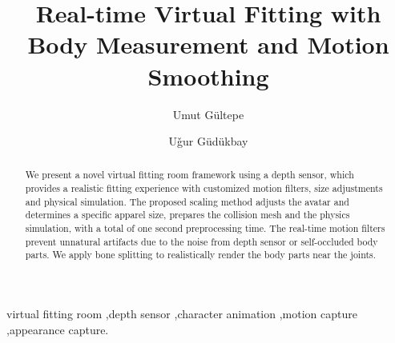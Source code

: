 \documentclass[number,preprint,review,12pt]{elsarticle}
\begin{document}
\begin{frontmatter}



\title{Real-time Virtual Fitting with \\Body Measurement and Motion Smoothing}


\author{Umut G\"{u}ltepe}
\author{U\v{g}ur G\"{u}d\"{u}kbay}

\address{Bilkent University, Department of Computer Engineering, Bilkent 06800 Ankara Turkey}

\begin{abstract}
We present a novel virtual fitting room framework using a depth sensor, which provides a realistic fitting experience with customized motion filters, size adjustments and physical simulation. The proposed scaling method adjusts the avatar and determines a specific apparel size, prepares the collision mesh and the physics simulation, with a total of one second preprocessing time. The real-time motion filters prevent unnatural artifacts due to the noise from depth sensor or self-occluded body parts. We apply bone splitting to realistically render the body parts near the joints.
\end{abstract}

\begin{keyword}
virtual fitting room \sep depth sensor \sep character animation \sep motion capture \sep appearance capture.

\end{keyword}

\end{frontmatter}
\end{document}
